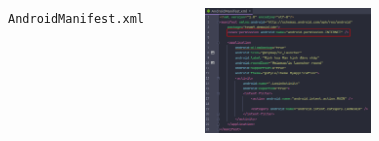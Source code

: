 \documentclass{beamer}
\begin{document}
\begin{frame}
\begin{columns}
\begin{figure}
        \end{figure}
        \indent \texttt{AndroidManifest.xml}
        \begin{figure}
            \centering
            \includegraphics[width=\textwidth]{images/26.png}
        \end{figure}
    \end{columns}
\end{frame}
\end{document}
